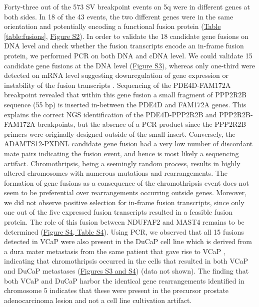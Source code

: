 Forty-three out of the 573 SV breakpoint events on 5q were in different genes at both sides. In 18 of the 43 events, the two different
genes were in the same orientation and potentially encoding a functional fusion protein (\hyperref[table:fusions]{Table \ref*{table:fusions}}, \href{https://link.springer.com/article/10.1007/s00439-013-1308-1#SupplementaryMaterial}{Figure S2}). In order to validate
the 18 candidate gene fusions on DNA level and check whether the fusion transcripts encode an in-frame fusion protein, we performed
PCR on both DNA and cDNA level. We could validate 15 candidate gene fusions at the DNA level (\href{https://link.springer.com/article/10.1007/s00439-013-1308-1#SupplementaryMaterial}{Figure S3}), whereas only one-third were
detected on mRNA level suggesting downregulation of gene expression or instability of the fusion transcripts \cite{stephens2011massive}.
Sequencing of the PDE4D-FAM172A breakpoint revealed that within this gene fusion a small fragment of PPP2R2B sequence (55 bp) is inserted
in-between the PDE4D and FAM172A genes. This explains the correct NGS identification of the PDE4D-PPP2R2B and PPP2R2B-FAM172A breakpoints,
 but the absence of a PCR product since the PPP2R2B primers were originally designed outside of the small insert. Conversely, the ADAMTS12-PXDNL
candidate gene fusion had a very low number of discordant mate pairs indicating the fusion event, and hence is most likely a sequencing artifact.
Chromothripsis, being a seemingly random process, results in highly altered chromosomes with numerous mutations and rearrangements. The formation
of gene fusions as a consequence of the chromothripsis event does not seem to be preferential over rearrangements occurring outside genes.
Moreover, we did not observe positive selection for in-frame fusion transcripts, since only one out of the five expressed fusion transcripts
resulted in a feasible fusion protein. The role of this fusion between NDUFAF2 and MAST4 remains to be determined (\href{https://link.springer.com/article/10.1007/s00439-013-1308-1#SupplementaryMaterial}{Figure S4, Table S4}). Using PCR,
we observed that all 15 fusions detected in VCaP were also present in the DuCaP cell line which is derived from a dura mater metastasis from the
same patient that gave rise to VCaP \cite{lee2001establishment}, indicating that chromothripsis occurred in the cells that resulted in both VCaP and DuCaP
metastases (\href{https://link.springer.com/article/10.1007/s00439-013-1308-1#SupplementaryMaterial}{Figures S3 and S4}) (data not shown). The finding that both VCaP and DuCaP harbor the identical gene rearrangements identified in
chromosome 5 indicates that these were present in the precursor prostate adenocarcinoma lesion and not a cell line cultivation artifact.



